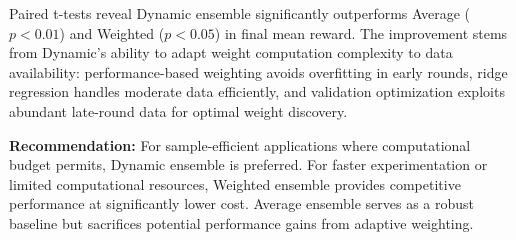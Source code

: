 \documentclass[conference]{IEEEtran}
\begin{document}
Paired t-tests reveal Dynamic ensemble significantly outperforms Average ($p < 0.01$) and Weighted ($p < 0.05$) in final mean reward. The improvement stems from Dynamic's ability to adapt weight computation complexity to data availability: performance-based weighting avoids overfitting in early rounds, ridge regression handles moderate data efficiently, and validation optimization exploits abundant late-round data for optimal weight discovery.

\textbf{Recommendation:} For sample-efficient applications where computational budget permits, Dynamic ensemble is preferred. For faster experimentation or limited computational resources, Weighted ensemble provides competitive performance at significantly lower cost. Average ensemble serves as a robust baseline but sacrifices potential performance gains from adaptive weighting.
\end{document}
